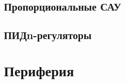 \chapter{Пропорциональные САУ}

\chapter{ПИДn-регуляторы}





\part{Периферия}













\printbibliography


